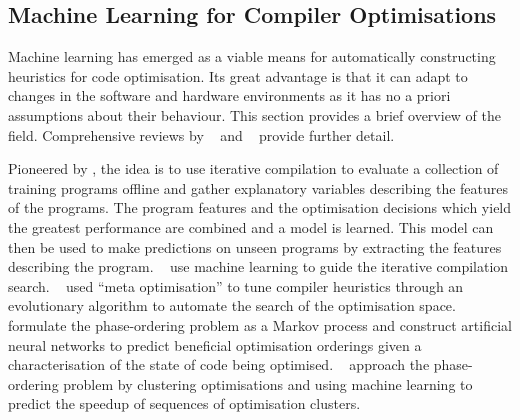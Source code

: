 \subsection{Machine Learning for Compiler Optimisations}
\label{subsec:related-work-machine-learning-optimisation}

Machine learning has emerged as a viable means for automatically constructing heuristics for code optimisation. Its great advantage is that it can adapt to changes in the software and hardware environments as it has no a priori assumptions about their behaviour.
This section provides a brief overview of the field. Comprehensive reviews by \citeauthor{Ashouri2018}~\cite{Ashouri2018} and
\citeauthor{Zhang2018}~\cite{Zhang2018} provide further detail.

Pioneered by \citeauthor{Agakov}, the idea is to use iterative compilation to evaluate a collection of training programs offline and gather explanatory variables describing the features of the programs. The program features and the optimisation decisions which yield the greatest performance are combined and a model is learned. This model can then be used to make predictions on unseen programs by extracting the features describing the program. \citeauthor{Agakov}~\cite{Agakov} use machine learning to guide the iterative compilation search.
\citeauthor{Stephenson2003}~\cite{Stephenson2003} used ``meta optimisation'' to tune compiler heuristics through an evolutionary algorithm to automate the search of the optimisation space.
\citeauthor{Kulkarni2012}~\cite{Kulkarni2012} formulate the phase-ordering problem as a Markov process and construct artificial neural networks to predict beneficial optimisation orderings given a characterisation of the state of code being optimised.
\citeauthor{Ashouri2017}~\cite{Ashouri2017} approach the phase-ordering problem by clustering optimisations and using machine learning to predict the speedup of sequences of optimisation clusters.

